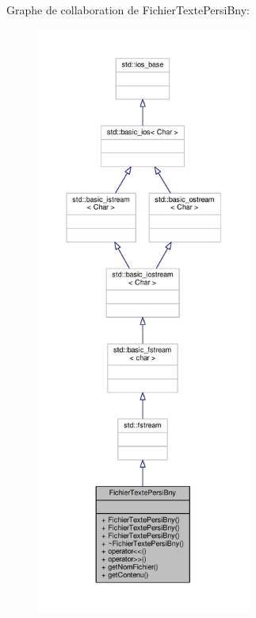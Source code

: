Graphe de collaboration de Fichier\+Texte\+Persi\+Bny\+:
\nopagebreak
\begin{figure}[H]
\begin{center}
\leavevmode
\includegraphics[height=550pt]{classFichierTextePersiBny__coll__graph}
\end{center}
\end{figure}
